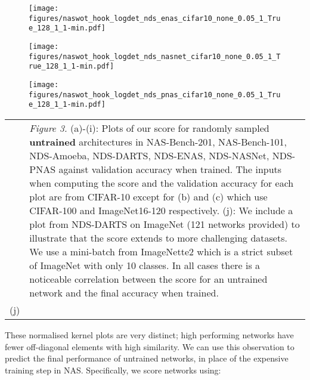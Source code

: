 \documentclass{article}
\begin{document}
\begin{figure*}[!ht]
\begin{subfigure}[b]{0.3\textwidth}
        \texttt{[image: figures/naswot\_hook\_logdet\_nds\_enas\_cifar10\_none\_0.05\_1\_True\_128\_1\_1-min.pdf]}
         \caption{}
         \label{fig:amoeba}
     \end{subfigure}
     \hfill
          \begin{subfigure}[b]{0.3\textwidth}
         \centering

         \texttt{[image: figures/naswot\_hook\_logdet\_nds\_nasnet\_cifar10\_none\_0.05\_1\_True\_128\_1\_1-min.pdf]}
         \caption{}
     \end{subfigure}
     \hfill
     \begin{subfigure}[b]{0.3\textwidth}
         \centering
         \texttt{[image: figures/naswot\_hook\_logdet\_nds\_pnas\_cifar10\_none\_0.05\_1\_True\_128\_1\_1-min.pdf]}
         \caption{}
         \label{fig:resnet}
     \end{subfigure}
     

         \begin{tabular}{l p{.66\linewidth}}
             \raisebox{-.75\height}{\texttt{[image: figures/naswot\_hook\_logdet\_nds\_darts\_in\_imagenette2\_none\_0.05\_1\_True\_128\_1\_1-min.pdf]}}
             & 
             \textit{Figure 3.} (a)-(i): Plots of our score for randomly sampled {\bf untrained} architectures in 
   NAS-Bench-201,
   NAS-Bench-101,
   NDS-Amoeba,
   NDS-DARTS,
   NDS-ENAS,
   NDS-NASNet,
   NDS-PNAS
   against validation accuracy when trained. The inputs when computing the score and the validation accuracy for each plot are from CIFAR-10 except for (b) and (c) which use CIFAR-100 and ImageNet16-120 respectively. (j): We include a plot from NDS-DARTS on ImageNet (121 networks provided) to illustrate that the score extends to more challenging datasets. We use a mini-batch from ImageNette2 which is a strict subset of ImageNet with only 10 classes. In all cases there is a noticeable correlation between the score for an untrained network and the final accuracy when trained.    \\
   \quad\quad\quad\quad\quad\quad\quad(j) & \\
         \end{tabular}
    
    
    \label{fig:scoreplots} 

\end{figure*}

These normalised kernel plots are very distinct; high performing networks have fewer off-diagonal elements with high similarity. We can use this observation to predict the final performance of untrained networks, in place of the expensive training step in NAS.
Specifically, we score networks using:
\end{document}
